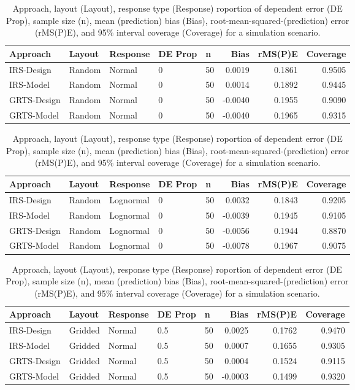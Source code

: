 \documentclass[]{elsarticle} %
\begin{document}
\begin{table}[ht]
\centering
\begin{tabular}{lllllrrr}
  \hline
Approach & Layout & Response & DE Prop & n & Bias & rMS(P)E & Coverage \\ 
  \hline
IRS-Design & Random & Normal & 0 & 50 & 0.0019 & 0.1861 & 0.9505 \\ 
  IRS-Model & Random & Normal & 0 & 50 & 0.0014 & 0.1892 & 0.9445 \\ 
  GRTS-Design & Random & Normal & 0 & 50 & -0.0040 & 0.1955 & 0.9090 \\ 
  GRTS-Model & Random & Normal & 0 & 50 & -0.0040 & 0.1965 & 0.9315 \\ 
   \hline
\end{tabular}
\caption{Approach, layout (Layout), response type (Response) roportion of dependent error (DE Prop), sample size (n), mean (prediction) bias (Bias), root-mean-squared-(prediction) error (rMS(P)E), and 95\% interval coverage (Coverage) for a simulation scenario.} 
\end{table}
\begin{table}[ht]
\centering
\begin{tabular}{lllllrrr}
  \hline
Approach & Layout & Response & DE Prop & n & Bias & rMS(P)E & Coverage \\ 
  \hline
IRS-Design & Random & Lognormal & 0 & 50 & 0.0032 & 0.1843 & 0.9205 \\ 
  IRS-Model & Random & Lognormal & 0 & 50 & -0.0039 & 0.1945 & 0.9105 \\ 
  GRTS-Design & Random & Lognormal & 0 & 50 & -0.0056 & 0.1944 & 0.8870 \\ 
  GRTS-Model & Random & Lognormal & 0 & 50 & -0.0078 & 0.1967 & 0.9075 \\ 
   \hline
\end{tabular}
\caption{Approach, layout (Layout), response type (Response) roportion of dependent error (DE Prop), sample size (n), mean (prediction) bias (Bias), root-mean-squared-(prediction) error (rMS(P)E), and 95\% interval coverage (Coverage) for a simulation scenario.} 
\end{table}
\begin{table}[ht]
\centering
\begin{tabular}{lllllrrr}
  \hline
Approach & Layout & Response & DE Prop & n & Bias & rMS(P)E & Coverage \\ 
  \hline
IRS-Design & Gridded & Normal & 0.5 & 50 & 0.0025 & 0.1762 & 0.9470 \\ 
  IRS-Model & Gridded & Normal & 0.5 & 50 & 0.0007 & 0.1655 & 0.9305 \\ 
  GRTS-Design & Gridded & Normal & 0.5 & 50 & 0.0004 & 0.1524 & 0.9115 \\ 
  GRTS-Model & Gridded & Normal & 0.5 & 50 & -0.0003 & 0.1499 & 0.9320 \\ 
   \hline
\end{tabular}
\caption{Approach, layout (Layout), response type (Response) roportion of dependent error (DE Prop), sample size (n), mean (prediction) bias (Bias), root-mean-squared-(prediction) error (rMS(P)E), and 95\% interval coverage (Coverage) for a simulation scenario.} 
\end{table}
\end{document}
